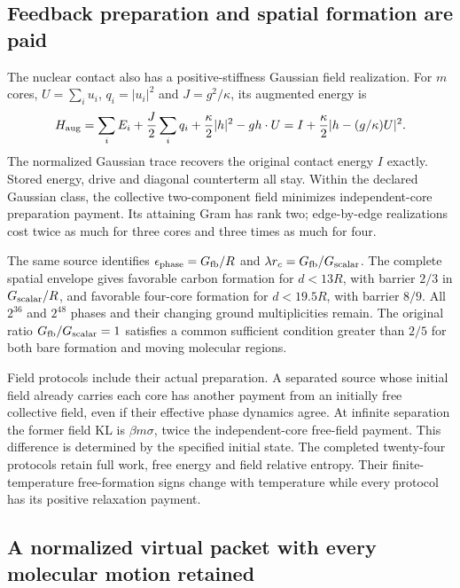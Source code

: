 \subsection{Feedback preparation and spatial formation are paid}

The nuclear contact also has a positive-stiffness Gaussian field realization. For $m$ cores, $U=\sum_i u_i$, $q_i=|u_i|^2$ and $J=g^2/\kappa$, its augmented energy is
\[
 H_{\rm aug}=\sum_iE_i+\frac J2\sum_iq_i
 +\frac\kappa2|h|^2-gh\cdot U
 =I+\frac\kappa2|h-(g/\kappa)U|^2.
\]
The normalized Gaussian trace recovers the original contact energy $I$ exactly. Stored energy, drive and diagonal counterterm all stay. Within the declared Gaussian class, the collective two-component field minimizes independent-core preparation payment. Its attaining Gram has rank two; edge-by-edge realizations cost twice as much for three cores and three times as much for four. 

The same source identifies $\epsilon_{\rm phase}=G_{\rm fb}/R$ and $\lambda r_c=G_{\rm fb}/G_{\rm scalar}$. The complete spatial envelope gives favorable carbon formation for $d<13R$, with barrier $2/3$ in $G_{\rm scalar}/R$, and favorable four-core formation for $d<19.5R$, with barrier $8/9$. All $2^{36}$ and $2^{48}$ phases and their changing ground multiplicities remain. The original ratio $G_{\rm fb}/G_{\rm scalar}=1$ satisfies a common sufficient condition greater than $2/5$ for both bare formation and moving molecular regions.

Field protocols include their actual preparation. A separated source whose initial field already carries each core has another payment from an initially free collective field, even if their effective phase dynamics agree. At infinite separation the former field KL is $\beta m\sigma$, twice the independent-core free-field payment. This difference is determined by the specified initial state. The completed twenty-four protocols retain full work, free energy and field relative entropy. Their finite-temperature free-formation signs change with temperature while every protocol has its positive relaxation payment.

\subsection{A normalized virtual packet with every molecular motion retained}

